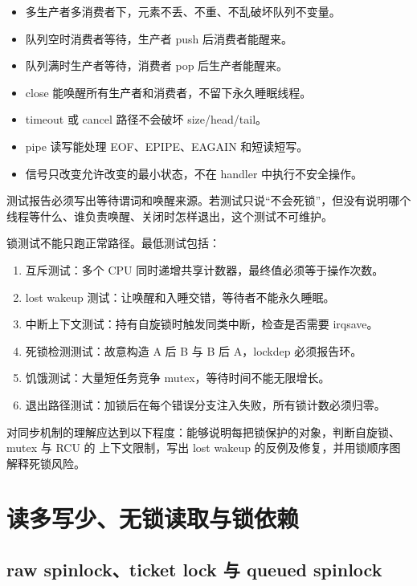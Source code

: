 \begin{itemize}
\tightlist
\item 多生产者多消费者下，元素不丢、不重、不乱破坏队列不变量。
\item 队列空时消费者等待，生产者 push 后消费者能醒来。
\item 队列满时生产者等待，消费者 pop 后生产者能醒来。
\item close 能唤醒所有生产者和消费者，不留下永久睡眠线程。
\item timeout 或 cancel 路径不会破坏 size/head/tail。
\item pipe 读写能处理 EOF、EPIPE、EAGAIN 和短读短写。
\item 信号只改变允许改变的最小状态，不在 handler 中执行不安全操作。
\end{itemize}

测试报告必须写出等待谓词和唤醒来源。若测试只说“不会死锁”，但没有说明哪个线程等什么、谁负责唤醒、关闭时怎样退出，这个测试不可维护。

锁测试不能只跑正常路径。最低测试包括：

\begin{enumerate}
\tightlist
\item 互斥测试：多个 CPU 同时递增共享计数器，最终值必须等于操作次数。
\item lost wakeup 测试：让唤醒和入睡交错，等待者不能永久睡眠。
\item 中断上下文测试：持有自旋锁时触发同类中断，检查是否需要 irqsave。
\item 死锁检测测试：故意构造 A 后 B 与 B 后 A，lockdep 必须报告环。
\item 饥饿测试：大量短任务竞争 mutex，等待时间不能无限增长。
\item 退出路径测试：加锁后在每个错误分支注入失败，所有锁计数必须归零。
\end{enumerate}

\begin{keyidea}
对同步机制的理解应达到以下程度：能够说明每把锁保护的对象，判断自旋锁、mutex 与 RCU 的
上下文限制，写出 lost wakeup 的反例及修复，并用锁顺序图解释死锁风险。
\end{keyidea}

\section{读多写少、无锁读取与锁依赖}

\subsection{raw spinlock、ticket lock 与 queued spinlock}

